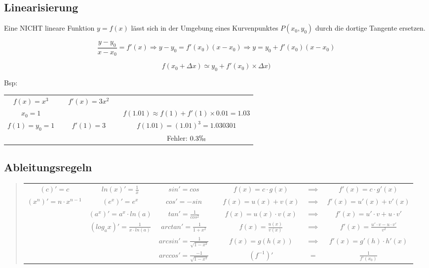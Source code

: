 \subsection*{Linearisierung}

Eine NICHT lineare Funktion $y=f(x)$ lässt sich in der Umgebung eines
Kurvenpunktes $P(x_{0},y_{0})$ durch die dortige Tangente ersetzen.

\[
\frac{y-y_{0}}{x-x_{0}}=f'(x)\Rightarrow y-y_{0}=f'(x_{0})(x-x_{0})\Rightarrow y=y_{0}+f'(x_{0})(x-x_{0})
\]


\[
f(x_{0}+\Delta x)\simeq y_{0}+f'(x_{0})\times\Delta x)
\]


Bsp:

\begin{tabular}{|c|c|c|cc}
\cline{1-1} \cline{3-3} 
$f(x)=x^{3}$ &  & $f'(x)=3x^{2}$ &  & \tabularnewline
\cline{1-1} \cline{3-3} 
$x_{0}=1$ & \multicolumn{1}{c}{} & \multicolumn{1}{c}{} &  & $f(1.01)\approx f(1)+f'(1)\times0.01=1.03$\tabularnewline
\cline{1-1} \cline{3-3} 
$f(1)=y_{0}=1$ &  & $f'(1)=3$ &  & $f(1.01)=(1.01)^{3}=1.030301$\tabularnewline
\cline{1-1} \cline{3-3} 
\multicolumn{1}{c}{} & \multicolumn{1}{c}{} & \multicolumn{1}{c}{} &  & Fehler: $0.3\permil$\tabularnewline
\end{tabular}


\subsection*{Ableitungsregeln}
\begin{quote}
\begin{tabular}{|c|c|c|c|c|c|c|}
\cline{1-3} \cline{5-7} 
$(c)'=c$ & $ln(x)'=\frac{1}{x}$ & $sin'=cos$ &  & $f(x)=c\cdot g(x)$ & $\implies$ & $f'(x)=c\cdot g'(x)$\tabularnewline
\cline{1-3} \cline{5-7} 
$(x^{n})'=n\cdot x^{n-1}$ & $(e^{x})'=e^{x}$ & $cos'=-sin$ &  & $f(x)=u(x)+v(x)$ & $\implies$ & $f'(x)=u'(x)+v'(x)$\tabularnewline
\cline{1-3} \cline{5-7} 
 & $(a^{x})'=a^{x}\cdot ln(a)$ & $tan'=\frac{1}{cos^{2}}$ &  & $f(x)=u(x)\cdot v(x)$ & $\implies$ & $f'(x)=u'\cdot v+u\cdot v'$\tabularnewline
\cline{2-3} \cline{5-7} 
 & $(log_{a}x)'=\frac{1}{x\cdot ln(a)}$ & $arctan'=\frac{1}{1+x^{2}}$ &  & $f(x)=\frac{u(x)}{v(x)}$ & $\implies$ & $f'(x)=\frac{u'\cdot v-u\cdot v'}{v^{2}}$\tabularnewline
\cline{3-3} \cline{5-7} 
 &  & $arcsin'=\frac{1}{\sqrt{1-x^{2}}}$ &  & $f(x)=g(h(x))$ & $\implies$ & $f'(x)=g'(h)\cdot h'(x)$\tabularnewline
\cline{3-3} \cline{5-7} 
 &  & $arccos'=\frac{-1}{\sqrt{1-x^{2}}}$ &  & $(f^{-1})'$ & $=$ & $\frac{1}{f'(x_{0})}$\tabularnewline
\end{tabular}
\end{quote}

